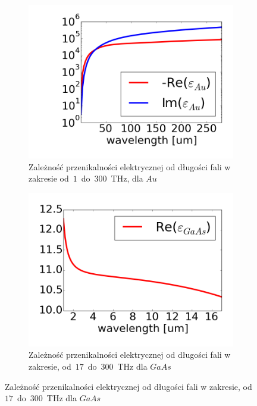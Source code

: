 \begin{figure}[tb]
	\begin{subfigure}{.45\textwidth}
		\includegraphics[width=\textwidth]{images/aueps.png}
		\caption{Zależność przenikalności elektrycznej od długości fali w zakresie od~$1$~do~$300$~THz, dla $Au$~\cite{ordal1983optical}}
		\label{fig:aueps}
	\end{subfigure}
	\begin{subfigure}{.45\textwidth}
		\includegraphics[width=\textwidth]{images/gaaseps.png}
		\caption{Zależność przenikalności elektrycznej od długości fali w zakresie, od~$17$~do~$300$~THz dla  $GaAs$~\cite{skauli2003improved}}
		\label{fig:gaaseps}
	\end{subfigure}
\end{figure}

